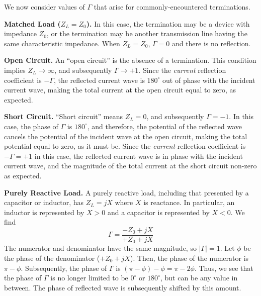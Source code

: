 

\label{m0085_Reflection_Coefficient_for_Various_Terminations} %

We now consider values of $\Gamma$  
that arise for commonly-encountered terminations.

{\bf Matched Load ($Z_L=Z_0$).} 
In this case, the termination may be a device with impedance $Z_0$, or the termination may be another transmission line having the same characteristic impedance. 
When $Z_L=Z_0$, $\Gamma=0$ and there is no reflection.   

{\bf Open Circuit.} 
An ``open circuit'' is the absence of a termination.
This condition implies $Z_L\rightarrow\infty$, and subsequently $\Gamma\rightarrow +1$.  
Since the \emph{current} reflection coefficient is $-\Gamma$, the reflected current wave is $180^{\circ}$ out of phase with the incident current wave, making the total current at the open circuit equal to zero, as expected.

{\bf Short Circuit.}  
``Short circuit'' means $Z_L=0$, and subsequently $\Gamma=-1$.
In this case, the phase of $\Gamma$ is $180^{\circ}$, and therefore, the potential of the reflected wave cancels the potential of the incident wave at the open circuit, making the total potential equal to zero, as it must be.  
Since the \emph{current} reflection coefficient is $-\Gamma=+1$ in this case, the reflected current wave is in phase with the incident current wave, and the magnitude of the total current at the short circuit non-zero as expected.

{\bf Purely Reactive Load.}
A purely reactive load, including that presented by a capacitor or inductor, has $Z_L = j X$ where $X$ is reactance.  
In particular, an inductor is represented by $X>0$ and a capacitor is represented by $X<0$.
We find
%
\begin{equation}
\Gamma = \frac{-Z_0+j X}{+Z_0+j X}
\end{equation}
%
The numerator and denominator have the same magnitude, so $\left|\Gamma\right|=1$.
Let $\phi$ be the phase of the denominator ($+Z_0+j X$).  
Then, the phase of the numerator is $\pi-\phi$.
Subsequently, the phase of $\Gamma$ is $\left(\pi-\phi\right)-\phi=\pi-2\phi$.
Thus, we see that the phase of $\Gamma$ is no longer limited to be $0^{\circ}$ or $180^{\circ}$, but can be any value in between.
The phase of reflected wave is subsequently shifted by this amount.

